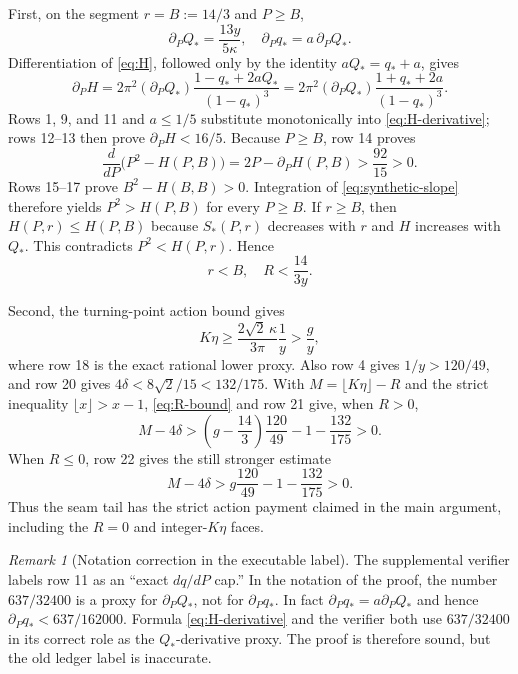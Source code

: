 \documentclass[11pt]{article}
\theoremstyle{remark}
\newtheorem{remark}[lemma]{Remark}
\begin{document}
First, on the segment $r=B:=14/3$ and $P\geq B$,
\[
 \partial_PQ_*=\frac{13y}{5\kappa},\quad
 \partial_Pq_*=a\,\partial_PQ_*.
\]
Differentiation of \eqref{eq:H}, followed only by the identity
$aQ_*=q_*+a$, gives
\begin{equation}
 \partial_PH
 =2\pi^2(\partial_PQ_*)
   \frac{1-q_*+2aQ_*}{(1-q_*)^3}
 =2\pi^2(\partial_PQ_*)
   \frac{1+q_*+2a}{(1-q_*)^3}.
 \label{eq:H-derivative}
\end{equation}
Rows 1, 9, and 11 and $a\leq1/5$ substitute monotonically into
\eqref{eq:H-derivative}; rows 12--13 then prove
$\partial_PH<16/5$.  Because $P\geq B$, row 14 proves
\begin{equation}
 \frac{d}{dP}\bigl(P^2-H(P,B)\bigr)
 =2P-\partial_PH(P,B)>\frac{92}{15}>0.
 \label{eq:synthetic-slope}
\end{equation}
Rows 15--17 prove $B^2-H(B,B)>0$.  Integration of
\eqref{eq:synthetic-slope} therefore yields $P^2>H(P,B)$ for every
$P\geq B$.  If $r\geq B$, then $H(P,r)\leq H(P,B)$ because
$S_*(P,r)$ decreases with $r$ and $H$ increases with $Q_*$.  This
contradicts $P^2<H(P,r)$.  Hence
\begin{equation}
 r<B,\quad R<\frac{14}{3y}.
 \label{eq:R-bound}
\end{equation}

Second, the turning-point action bound gives
\[
 K\eta\geq\frac{2\sqrt2\,\kappa}{3\pi}\frac1y
 >\frac{g}{y},
\]
where row 18 is the exact rational lower proxy.  Also row 4 gives
$1/y>120/49$, and row 20 gives
$4\delta<8\sqrt2/15<132/175$.  With
$M=\lfloor K\eta\rfloor-R$ and the strict inequality
$\lfloor x\rfloor>x-1$, \eqref{eq:R-bound} and row 21 give, when
$R>0$,
\[
 M-4\delta>
 \left(g-\frac{14}{3}\right)\frac{120}{49}
 -1-\frac{132}{175}>0.
\]
When $R\leq0$, row 22 gives the still stronger estimate
\[
 M-4\delta>
 g\frac{120}{49}-1-\frac{132}{175}>0.
\]
Thus the seam tail has the strict action payment claimed in the main
argument, including the $R=0$ and integer-$K\eta$ faces.

\begin{remark}[Notation correction in the executable label]
The supplemental verifier labels row 11 as an ``exact $dq/dP$ cap.''
In the notation of the proof, the number $637/32400$ is a proxy for
$\partial_PQ_*$, not for $\partial_Pq_*$.  In fact
$\partial_Pq_*=a\partial_PQ_*$ and hence
$\partial_Pq_*<637/162000$.  Formula \eqref{eq:H-derivative} and the
verifier both use $637/32400$ in its correct role as the $Q_*$-derivative
proxy.  The proof is therefore sound, but the old ledger label is
inaccurate.
\end{remark}
\end{document}
